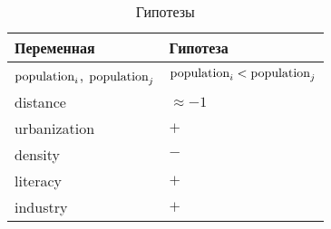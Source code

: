 \begin{table}
	\caption{Гипотезы}
	\label{table:hypo}
	\centering
	\begin{tabularx}{\textwidth}{XX}  %
		\toprule
		Переменная                   & Гипотеза                              \\ 
		\midrule
		$\textup{population}_i$, $\textup{population}_j$ & $\textup{population}_i < \textup{population}_j$ \\
		distance                     & $\approx-1$                            \\
		urbanization                 & $+$                                    \\
		density                      & $-$                                    \\
		literacy                     & $+$                                    \\
		industry                     & $+$                                    \\
		\bottomrule
	\end{tabularx}
\end{table}